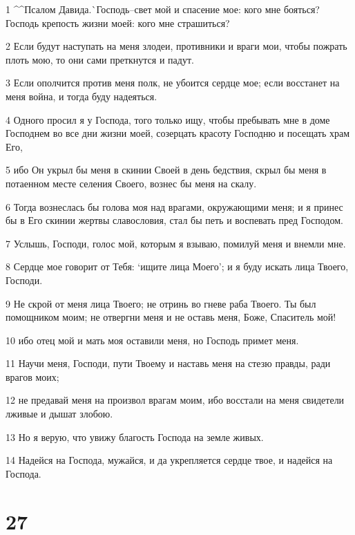 \par 1 ^^Псалом Давида.^^ Господь--свет мой и спасение мое: кого мне бояться? Господь крепость жизни моей: кого мне страшиться?
\par 2 Если будут наступать на меня злодеи, противники и враги мои, чтобы пожрать плоть мою, то они сами преткнутся и падут.
\par 3 Если ополчится против меня полк, не убоится сердце мое; если восстанет на меня война, и тогда буду надеяться.
\par 4 Одного просил я у Господа, того только ищу, чтобы пребывать мне в доме Господнем во все дни жизни моей, созерцать красоту Господню и посещать храм Его,
\par 5 ибо Он укрыл бы меня в скинии Своей в день бедствия, скрыл бы меня в потаенном месте селения Своего, вознес бы меня на скалу.
\par 6 Тогда вознеслась бы голова моя над врагами, окружающими меня; и я принес бы в Его скинии жертвы славословия, стал бы петь и воспевать пред Господом.
\par 7 Услышь, Господи, голос мой, которым я взываю, помилуй меня и внемли мне.
\par 8 Сердце мое говорит от Тебя: `ищите лица Моего'; и я буду искать лица Твоего, Господи.
\par 9 Не скрой от меня лица Твоего; не отринь во гневе раба Твоего. Ты был помощником моим; не отвергни меня и не оставь меня, Боже, Спаситель мой!
\par 10 ибо отец мой и мать моя оставили меня, но Господь примет меня.
\par 11 Научи меня, Господи, пути Твоему и наставь меня на стезю правды, ради врагов моих;
\par 12 не предавай меня на произвол врагам моим, ибо восстали на меня свидетели лживые и дышат злобою.
\par 13 Но я верую, что увижу благость Господа на земле живых.
\par 14 Надейся на Господа, мужайся, и да укрепляется сердце твое, и надейся на Господа.

\chapter{27}

